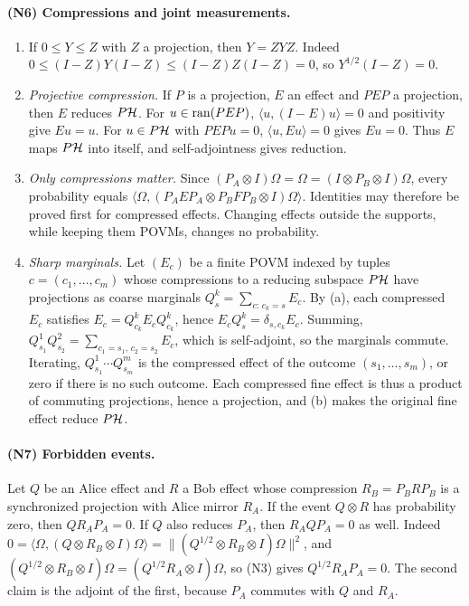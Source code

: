 \paragraph{(N6) Compressions and joint measurements.}
\begin{enumerate}[label=(\alph*)]
\item If $0\leq Y\leq Z$ with $Z$ a projection, then $Y=ZYZ$. Indeed $0\leq(I-Z)Y(I-Z)\leq(I-Z)Z(I-Z)=0$, so $Y^{1/2}(I-Z)=0$.
\item \emph{Projective compression.} If $P$ is a projection, $E$ an effect and $PEP$ a projection, then $E$ reduces $P\mathcal H$. For $u\in\operatorname{ran}(PEP)$, $\langle u,(I-E)u\rangle=0$ and positivity give $Eu=u$. For $u\in P\mathcal H$ with $PEPu=0$, $\langle u,Eu\rangle=0$ gives $Eu=0$. Thus $E$ maps $P\mathcal H$ into itself, and self-adjointness gives reduction.
\item \emph{Only compressions matter.} Since $(P_A\otimes I)\Omega=\Omega=(I\otimes P_B\otimes I)\Omega$, every probability equals $\langle\Omega,(P_AEP_A\otimes P_BFP_B\otimes I)\Omega\rangle$. Identities may therefore be proved first for compressed effects. Changing effects outside the supports, while keeping them POVMs, changes no probability.
\item \emph{Sharp marginals.} Let $(E_c)$ be a finite POVM indexed by tuples $c=(c_1,\ldots,c_m)$ whose compressions to a reducing subspace $P\mathcal H$ have projections as coarse marginals $Q^k_s=\sum_{c:\,c_k=s}E_c$. By (a), each compressed $E_c$ satisfies $E_c=Q^k_{c_k}E_cQ^k_{c_k}$, hence $E_cQ^k_s=\delta_{s,c_k}E_c$. Summing, $Q^1_{s_1}Q^2_{s_2}=\sum_{c_1=s_1,\,c_2=s_2}E_c$, which is self-adjoint, so the marginals commute. Iterating, $Q^1_{s_1}\cdots Q^m_{s_m}$ is the compressed effect of the outcome $(s_1,\ldots,s_m)$, or zero if there is no such outcome. Each compressed fine effect is thus a product of commuting projections, hence a projection, and (b) makes the original fine effect reduce $P\mathcal H$.
\end{enumerate}

\paragraph{(N7) Forbidden events.}
Let $Q$ be an Alice effect and $R$ a Bob effect whose compression $R_B=P_BRP_B$ is a synchronized projection with Alice mirror $R_A$. If the event $Q\otimes R$ has probability zero, then $QR_AP_A=0$. If $Q$ also reduces $P_A$, then $R_AQP_A=0$ as well. Indeed $0=\langle\Omega,(Q\otimes R_B\otimes I)\Omega\rangle=\|(Q^{1/2}\otimes R_B\otimes I)\Omega\|^2$, and $(Q^{1/2}\otimes R_B\otimes I)\Omega=(Q^{1/2}R_A\otimes I)\Omega$, so (N3) gives $Q^{1/2}R_AP_A=0$. The second claim is the adjoint of the first, because $P_A$ commutes with $Q$ and $R_A$.

